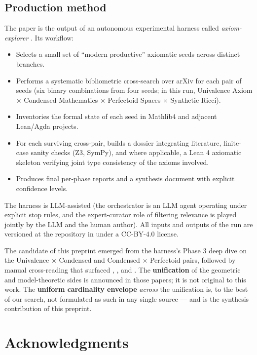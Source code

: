 \documentclass[11pt]{article}
\theoremstyle{definition}
\theoremstyle{plain}
\theoremstyle{remark}
\begin{document}
\subsection{Production method}

The paper is the output of an autonomous experimental harness called
\emph{axiom-explorer} \cite{AxiomExplorerRepo}. Its workflow:

\begin{itemize}
\item Selects a small set of ``modern productive'' axiomatic seeds across
distinct branches.
\item Performs a systematic bibliometric cross-search over arXiv for each
pair of seeds (six binary combinations from four seeds; in this run,
Univalence Axiom $\times$ Condensed Mathematics $\times$ Perfectoid Spaces
$\times$ Synthetic Ricci).
\item Inventories the formal state of each seed in Mathlib4 and adjacent
Lean/Agda projects.
\item For each surviving cross-pair, builds a dossier integrating literature,
finite-case sanity checks (Z3, SymPy), and where applicable, a Lean 4
axiomatic skeleton verifying joint type consistency of the axioms involved.
\item Produces final per-phase reports and a synthesis document with
explicit confidence levels.
\end{itemize}

The harness is LLM-assisted (the orchestrator is an LLM agent operating
under explicit stop rules, and the expert-curator role of filtering
relevance is played jointly by the LLM and the human author). All inputs and
outputs of the run are versioned at the repository in
\cite{AxiomExplorerRepo} under a CC-BY-4.0 license.

The candidate of this preprint emerged from the harness's Phase 3 deep dive
on the Univalence $\times$ Condensed and Condensed $\times$ Perfectoid pairs,
followed by manual cross-reading that surfaced \cite{Haine2026classifying},
\cite{BergfalkLH2024}, \cite{BLHS2023} and \cite{BannisterBasak2026}. The
\textbf{unification} of the geometric and model-theoretic sides is announced
in those papers; it is not original to this work. The \textbf{uniform
cardinality envelope} \emph{across} the unification is, to the best of our
search, not formulated as such in any single source --- and is the synthesis
contribution of this preprint.

\section{Acknowledgments}
\end{document}
